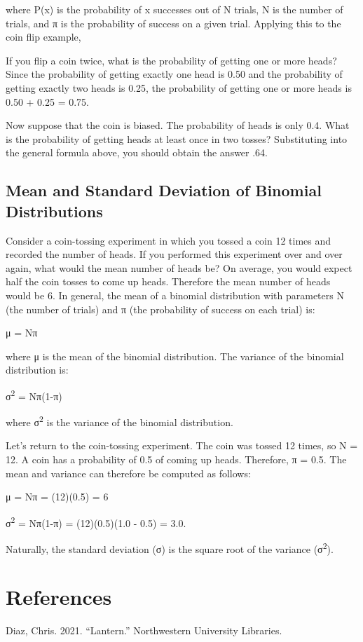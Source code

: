 \documentclass[
  11pt,
,
onecolumn,
openany
]{book}
\newenvironment{CSLReferences}%
  {}%
  {\par}
\begin{document}
where P(x) is the probability of x successes out of N trials, N is the number
of trials, and π is the probability of success on a given trial. Applying this
to the coin flip example,

If you flip a coin twice, what is the probability of getting one or more
heads? Since the probability of getting exactly one head is 0.50 and the
probability of getting exactly two heads is 0.25, the probability of getting
one or more heads is 0.50 + 0.25 = 0.75.

Now suppose that the coin is biased. The probability of heads is only 0.4.
What is the probability of getting heads at least once in two tosses?
Substituting into the general formula above, you should obtain the answer .64.

\hypertarget{mean-and-standard-deviation-of-binomial-distributions}{%
\section{Mean and Standard Deviation of Binomial
Distributions}\label{mean-and-standard-deviation-of-binomial-distributions}}

Consider a coin-tossing experiment in which you tossed a coin 12 times and
recorded the number of heads. If you performed this experiment over and over
again, what would the mean number of heads be? On average, you would expect
half the coin tosses to come up heads. Therefore the mean number of heads
would be 6. In general, the mean of a binomial distribution with parameters N
(the number of trials) and π (the probability of success on each trial) is:

μ = Nπ

where μ is the mean of the binomial distribution. The variance of the binomial
distribution is:

σ\textsuperscript{2} = Nπ(1-π)

where σ\textsuperscript{2} is the variance of the binomial distribution.

Let's return to the coin-tossing experiment. The coin was tossed 12 times, so
N = 12. A coin has a probability of 0.5 of coming up heads. Therefore, π =
0.5. The mean and variance can therefore be computed as follows:

μ = Nπ = (12)(0.5) = 6

σ\textsuperscript{2} = Nπ(1-π) = (12)(0.5)(1.0 - 0.5) = 3.0.

Naturally, the standard deviation (σ) is the square root of the variance
(σ\textsuperscript{2}).

\hypertarget{bibliography}{%
\chapter*{References}\label{bibliography}}

\hypertarget{refs}{}
\begin{CSLReferences}{1}{0}
\leavevmode{}%
Diaz, Chris. 2021. {``Lantern.''} Northwestern University Libraries.

\end{CSLReferences}
\end{document}
